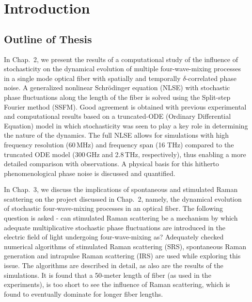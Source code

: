 
\renewcommand{\thechapter}{1}

\chapter{Introduction}

\section{Outline of Thesis}

In Chap.\ 2, we present the results of a computational study of the
influence of stochasticity on the dynamical evolution of multiple 
four-wave-mixing processes in a single mode optical fiber with spatially
and temporally $\delta$-correlated phase noise. A generalized nonlinear
Schr\"odinger equation (NLSE) with stochastic phase fluctuations along the
length of the fiber is solved using the Split-step Fourier method
(SSFM). Good agreement is obtained with previous experimental and
computational results based on a truncated-ODE (Ordinary Differential
Equation) model in which stochasticity was seen to play a key role in
determining the nature of the dynamics. The full NLSE allows for
simulations with high frequency resolution (60\,MHz) and frequency span (16
THz) compared to the truncated ODE model (300\,GHz and 2.8\,THz,
respectively), thus enabling a more detailed comparison with
observations. A physical basis for this hitherto phenomenological phase
noise is discussed and quantified.

In Chap.\ 3, we discuss the implications of spontaneous and stimulated
Raman scattering on the project discussed in Chap.\ 2, namely, the dynamical evolution of 
stochastic four-wave-mixing processes in an optical fiber.
The following question is asked - can stimulated Raman scattering be a mechanism by which
adequate multiplicative stochastic phase fluctuations are introduced in the 
electric field of light undergoing four-wave-mixing as? Adequately checked numerical
algorithms of stimulated Raman scattering (SRS), spontaneous Raman generation and intrapulse 
Raman scattering (IRS) are used while exploring this issue. The algorithms are described in detail, as also are 
the results of the simulations. It is found that a 50-meter length of fiber (as used in the experiments),
is too short to see the influence of Raman scattering, which is found to eventually 
dominate for longer fiber lengths.

